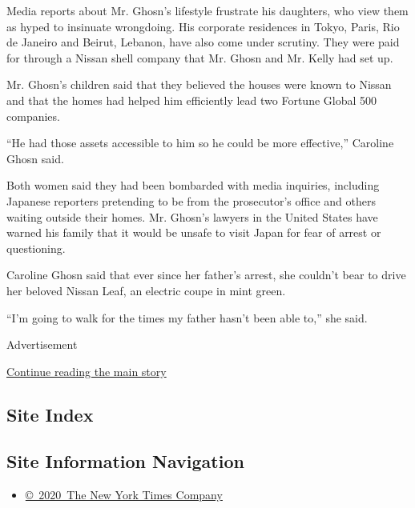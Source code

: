 Media reports about Mr. Ghosn's lifestyle frustrate his daughters, who
view them as hyped to insinuate wrongdoing. His corporate residences in
Tokyo, Paris, Rio de Janeiro and Beirut, Lebanon, have also come under
scrutiny. They were paid for through a Nissan shell company that Mr.
Ghosn and Mr. Kelly had set up.

Mr. Ghosn's children said that they believed the houses were known to
Nissan and that the homes had helped him efficiently lead two Fortune
Global 500 companies.

``He had those assets accessible to him so he could be more effective,''
Caroline Ghosn said.

Both women said they had been bombarded with media inquiries, including
Japanese reporters pretending to be from the prosecutor's office and
others waiting outside their homes. Mr. Ghosn's lawyers in the United
States have warned his family that it would be unsafe to visit Japan for
fear of arrest or questioning.

Caroline Ghosn said that ever since her father's arrest, she couldn't
bear to drive her beloved Nissan Leaf, an electric coupe in mint green.

``I'm going to walk for the times my father hasn't been able to,'' she
said.

Advertisement

\protect\hyperlink{after-bottom}{Continue reading the main story}

\hypertarget{site-index}{%
\subsection{Site Index}\label{site-index}}

\hypertarget{site-information-navigation}{%
\subsection{Site Information
Navigation}\label{site-information-navigation}}

\begin{itemize}
\tightlist
\item
  \href{https://help.nytimes.com/hc/en-us/articles/115014792127-Copyright-notice}{©~2020~The
  New York Times Company}
\end{itemize}

